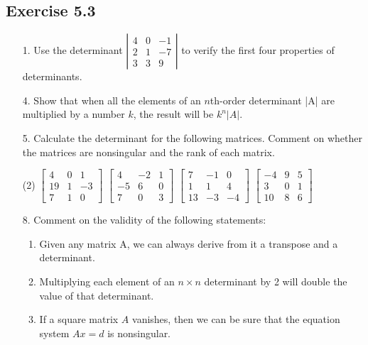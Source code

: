 \documentclass{./../../Latex/homework}
\begin{document}
\thispagestyle{plain}

\subsection*{Exercise 5.3}

\begin{enumerate}

\item[1.] Use the determinant $\left|\begin{array}{rrr}4 & 0 & -1 \\ 2 & 1 & -7 \\ 3 & 3 & 9\end{array}\right|$ to verify the first four properties of determinants.

\item[4.] Show that when all the elements of an $n$th-order determinant |A| are multiplied by a number $k$, the result will be $k^{n}|A|$.

\item[5.] Calculate the determinant for the following matrices. Comment on whether the matrices are nonsingular and the rank of each matrix.
\begin{tasks}(2)
\task $\left[\begin{array}{rrr}4 & 0 & 1 \\ 19 & 1 & -3 \\ 7 & 1 & 0\end{array}\right]$
\task $\left[\begin{array}{rrr}4 & -2 & 1 \\ -5 & 6 & 0 \\ 7 & 0 & 3\end{array}\right]$
\task $\left[\begin{array}{rrr}7 & -1 & 0 \\ 1 & 1 & 4 \\ 13 & -3 & -4\end{array}\right]$
\task $\left[\begin{array}{rrr}-4 & 9 & 5 \\ 3 & 0 & 1 \\ 10 & 8 & 6\end{array}\right]$	
\end{tasks}

\item[8.] Comment on the validity of the following statements:
\begin{enumerate}
\item Given any matrix A, we can always derive from it a transpose and a determinant.
\item Multiplying each element of an $n \times n$ determinant by 2 will double the value of that determinant.
\item If a square matrix $A$ vanishes, then we can be sure that the equation system $A x=d$ is nonsingular.
\end{enumerate}
\end{enumerate}
\end{document}
